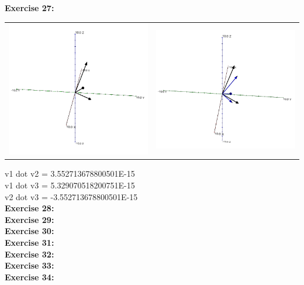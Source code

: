 \documentclass[10pt]{article}
\begin{document}
	\textbf{\large Exercise 27:}\\
	\begin{tabular}{cc}
		\includegraphics[scale=.4]{module7_exercise27} & \includegraphics[scale=.4]{module7_exercise27_b}
	\end{tabular}
	
	v1 dot v2 = 3.552713678800501E-15\\
	v1 dot v3 = 5.329070518200751E-15\\
	v2 dot v3 = -3.552713678800501E-15
	\\
	
	\textbf{\large Exercise 28:}\\
	
	\textbf{\large Exercise 29:}\\
	
	\textbf{\large Exercise 30:}\\
	
	\textbf{\large Exercise 31:}\\
	
	\textbf{\large Exercise 32:}\\
	
	\textbf{\large Exercise 33:}\\
	
	\textbf{\large Exercise 34:}\\
	
\end{document}
